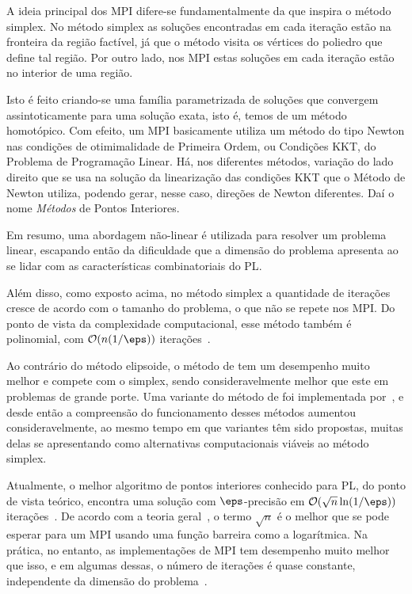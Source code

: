 A ideia principal dos \ac{MPI} difere-se fundamentalmente da que inspira o
método simplex. No método simplex as soluções encontradas em cada iteração estão
na fronteira da região factível, já que o método visita os vértices do poliedro
que define tal região. Por outro lado, nos \ac{MPI} estas soluções em cada
iteração estão no interior de uma região. 

Isto é feito criando-se uma família
parametrizada de soluções que convergem assintoticamente para uma solução exata,
isto é, temos de um método homotópico. Com efeito, um \ac{MPI} basicamente utiliza um método do tipo Newton nas condições de otimimalidade de Primeira Ordem, ou Condições KKT, do Problema de Programação Linear. Há, nos diferentes métodos, variação  do lado direito que se usa na solução da linearização das condições KKT que o Método de Newton utiliza, podendo gerar, nesse caso,  direções de Newton diferentes. Daí o nome \emph{Métodos} de Pontos Interiores. 

Em resumo,  uma abordagem não-linear é utilizada para resolver um problema
linear, escapando então da  dificuldade que a dimensão do problema apresenta ao
se lidar com as características combinatoriais  do \ac{PL}.


Além disso,  como exposto acima,  no método simplex a quantidade de
iterações cresce de acordo com o tamanho do problema,  o que não se repete
nos \ac{MPI}. Do ponto de vista
da complexidade computacional, esse método também é polinomial,  com
$\mathcal{O}(n(1/\eps))$ iterações~\cite{Karmarkar:1984cp}.
 
  
Ao contrário do método elipsoide, o método de \citeauthor{Karmarkar:1984cp} tem um desempenho muito
melhor e compete com o simplex, sendo consideravelmente melhor  que este em
problemas de grande porte. Uma variante do método de \citeauthor{Karmarkar:1984cp} foi implementada
por~\textcite{Adler:1989fw}, e desde então a compreensão do funcionamento desses
métodos aumentou consideravelmente, ao mesmo tempo em que variantes têm
sido propostas, muitas delas se apresentando como alternativas computacionais
viáveis ao método simplex.

Atualmente, o melhor algoritmo de pontos interiores conhecido para \ac{PL},  do ponto de vista teórico, 
encontra uma solução com $\eps$-precisão em $\Oset(\sqrt{n}\ln(1/\eps))$
iterações~\cite{Renegar:1988cr}.
De acordo com a teoria geral~\cite[Capítulo 4]{Nesterov:2003wi}, o termo
$\sqrt{n}$  é o melhor que se pode esperar para um \ac{MPI} usando uma função barreira como a
logarítmica. Na prática, no entanto, as implementações de \ac{MPI}  tem desempenho muito melhor que
isso, e em algumas dessas, o número de iterações é quase constante, independente da dimensão do
problema~\cite{Colombo:2008ia}.

